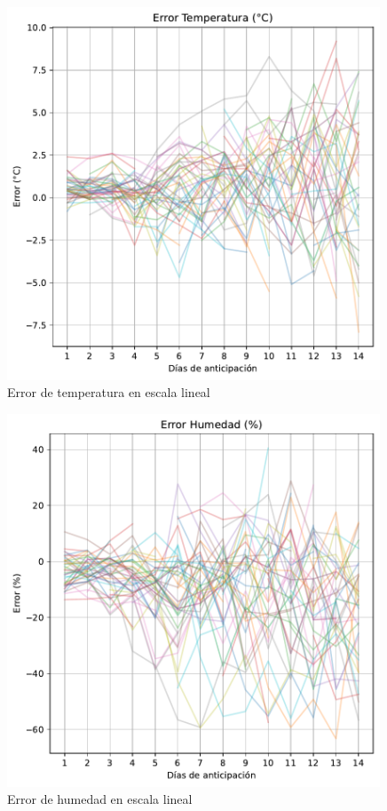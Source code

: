 \documentclass[
  10pt,
  a4paper,
  DIV=11,
  numbers=noendperiod,
  open=any]{scrreprt}
\numberwithin{equation}{chapter}
\numberwithin{equation}{section}
\renewcommand{\[}{\begin{equation}}
\renewcommand{\]}{\end{equation}}
\begin{document}
\begin{figure}[h]
  \centering
  \includegraphics[width=0.99\textwidth]{03-meteorologia/predicciones_files/figure-pdf/cell-2-output-1.pdf}
  \caption{Error de temperatura en escala lineal}
\end{figure}

\begin{figure}[h]
  \centering
  \includegraphics[width=0.99\textwidth]{03-meteorologia/predicciones_files/figure-pdf/cell-2-output-2.pdf}
  \caption{Error de humedad en escala lineal}
\end{figure}
\end{document}

